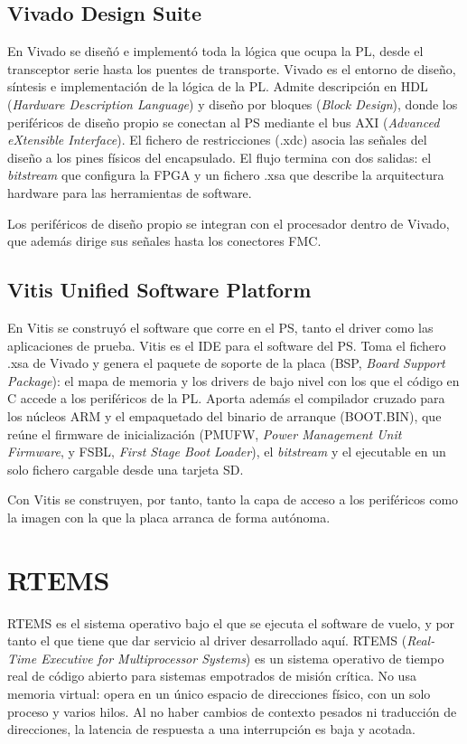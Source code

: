 \subsection{Vivado Design Suite}

En Vivado se diseñó e implementó toda la lógica que ocupa la PL, desde el transceptor serie
hasta los puentes de transporte. Vivado es el entorno de diseño, síntesis e implementación de la lógica de la PL. Admite
descripción en HDL (\textit{Hardware Description Language}) y diseño por bloques (\textit{Block
Design}), donde los periféricos de diseño propio se conectan al PS mediante el bus AXI
(\textit{Advanced eXtensible Interface}). El fichero de
restricciones (.xdc) asocia las señales del diseño a los pines físicos del encapsulado. El flujo
termina con dos salidas: el \textit{bitstream} que configura la FPGA y un fichero .xsa que
describe la arquitectura hardware para las herramientas de software.

Los periféricos de diseño propio se integran con el procesador dentro de Vivado, que además
dirige sus señales hasta los conectores FMC.

\subsection{Vitis Unified Software Platform}

En Vitis se construyó el software que corre en el PS, tanto el driver como las aplicaciones de
prueba. Vitis es el IDE para el software del PS. Toma el fichero .xsa de Vivado y genera el paquete de
soporte de la placa (BSP, \textit{Board Support Package}): el mapa de memoria y los drivers
de bajo nivel con los que el código en C accede a los periféricos de la PL. Aporta además el
compilador cruzado para los núcleos ARM y el empaquetado del binario de arranque (BOOT.BIN), que
reúne el firmware de inicialización (PMUFW, \textit{Power Management Unit Firmware}, y FSBL,
\textit{First Stage Boot Loader}), el \textit{bitstream} y el ejecutable en un
solo fichero cargable desde una tarjeta SD.

Con Vitis se construyen, por tanto, tanto la capa de acceso a los periféricos como la imagen con
la que la placa arranca de forma autónoma.

\section{RTEMS}

RTEMS es el sistema operativo bajo el que se ejecuta el software de vuelo, y por tanto el que
tiene que dar servicio al driver desarrollado aquí. RTEMS (\textit{Real-Time Executive for Multiprocessor Systems}) es un sistema operativo de tiempo
real de código abierto para sistemas empotrados de misión crítica. No usa memoria virtual:
opera en un único espacio de direcciones físico, con un solo proceso y varios hilos. Al no haber
cambios de contexto pesados ni traducción de direcciones, la latencia de respuesta a una
interrupción es baja y acotada.

